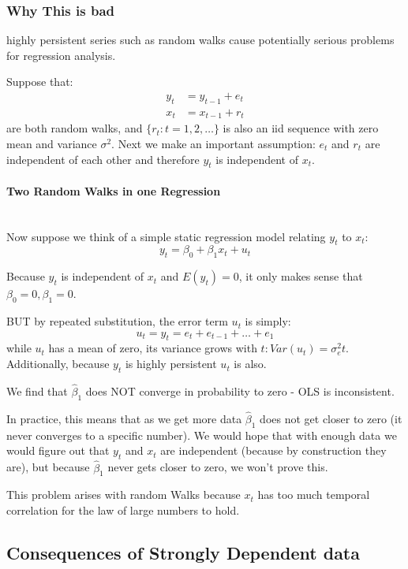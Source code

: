 \documentclass[11pt]{article}
\begin{document}
\subsubsection{Why This is bad}

highly persistent series such as random walks cause potentially serious problems for regression analysis.

Suppose that:
\begin{align*}
    y_t &= y_{t-1} + e_t \\
    x_t &= x_{t-1} + r_t
\end{align*}
are both random walks, and $\{r_t: t = 1,2,\ldots \}$ is also an iid sequence with zero mean and variance $\sigma^2$. Next we make an important assumption: $e_t$ and $r_t$ are independent of each other and therefore $y_t$ is independent of $x_t$.

\paragraph{Two Random Walks in one Regression} \mbox{} \\
Now suppose we think of a simple static regression model relating $y_t$ to $x_t$:
\[y_t = \beta_0 + \beta_1 x_t + u_t\]

Because $y_t$ is independent of $x_t$ and $E(y_t) = 0$, it only makes sense that $\beta_0 = 0, \beta_1 = 0$.

BUT by repeated substitution, the error term $u_t$ is simply:
\[u_t = y_t = e_t + e_{t-1} + \ldots + e_1\]
while $u_t$ has a mean of zero, its variance grows with $t: Var(u_t) = \sigma_e^2 t$. Additionally, because $y_t$ is highly persistent $u_t$ is also.

We find that $\hat{\beta}_1$ does NOT converge in probability to zero - OLS is inconsistent.

In practice, this means that as we get more data $\hat{\beta}_1$ does not get closer to zero (it never converges to a specific number). We would hope that with enough data we would  figure out that $y_t$ and $x_t$ are independent (because by construction they are), but because $\hat{\beta}_1$ never gets closer to zero, we won't prove this. 

This problem arises with random Walks because $x_t$ has too much temporal correlation for the law of large numbers to hold.

\subsection{Consequences of Strongly Dependent data}
\end{document}
